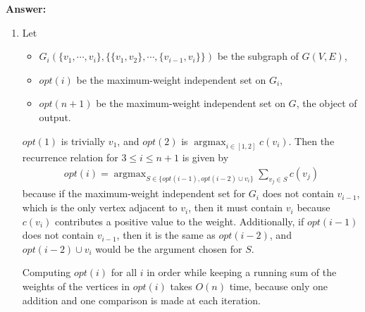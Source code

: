 \documentclass[a4paper,11pt]{article}
\DeclareMathOperator*{\argmax}{argmax}
\begin{document}
\noindent
{\bf Answer:} 
\begin{enumerate}[label=(\alph*)]
    \item
        Let
        \begin{itemize}
            \item
                $G_i(\{ v_1, \cdots, v_i \}, \{ \{ v_1, v_2 \}, \cdots, \{ v_{i - 1}, v_i \} \})$ be the subgraph of $G(V, E)$,
            \item
                $opt(i)$ be the maximum-weight independent set on $G_i$,
            \item
                $opt(n + 1)$ be the maximum-weight independent set on $G$, the object of output.
        \end{itemize}
        $opt(1)$ is trivially $v_1$, and $opt(2)$ is $\argmax_{i \in [1, 2]} c(v_i)$. Then the recurrence relation for $3 \leq i \leq n + 1$ is given by
        \begin{align*}
            opt(i) = \argmax_{S \in \{ opt(i - 1), opt(i - 2) \cup v_i \}} \sum_{v_j \in S} c(v_j)
        \end{align*}
        because if the maximum-weight independent set for $G_i$ does not contain $v_{i - 1}$, which is the only vertex adjacent to $v_i$, then it must contain $v_i$ because $c(v_i)$ contributes a positive value to the weight. Additionally, if $opt(i - 1)$ does not contain $v_{i - 1}$, then it is the same as $opt(i - 2)$, and $opt(i - 2) \cup v_i$ would be the argument chosen for $S$. \par
        Computing $opt(i)$ for all $i$ in order while keeping a running sum of the weights of the vertices in $opt(i)$ takes $O(n)$ time, because only one addition and one comparison is made at each iteration.


\end{enumerate}
\end{document}
